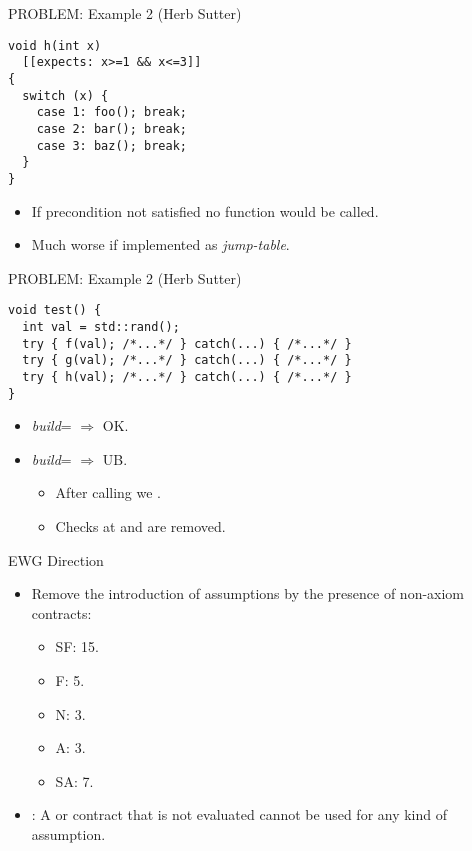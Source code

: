 \begin{frame}[t,fragile]{PROBLEM: Example 2 (Herb Sutter)}
\begin{block}{}
\begin{lstlisting}
void h(int x)
  [[expects: x>=1 && x<=3]]
{
  switch (x) {
    case 1: foo(); break;
    case 2: bar(); break;
    case 3: baz(); break;
  }
}
\end{lstlisting}
\end{block}
\begin{itemize}
	\item If precondition not satisfied \alert{no function would be called}.
	\item Much \alert{worse} if  implemented as \emph{jump-table}.
\end{itemize}
\end{frame}

\begin{frame}[t,fragile]{PROBLEM: Example 2 (Herb Sutter)}
\begin{block}{}
\begin{lstlisting}
void test() {
  int val = std::rand();
  try { f(val); /*...*/ } catch(...) { /*...*/ }
  try { g(val); /*...*/ } catch(...) { /*...*/ }
  try { h(val); /*...*/ } catch(...) { /*...*/ }
}
\end{lstlisting}
\end{block}
\begin{itemize}
\item \pause \emph{build}= $\Rightarrow$ OK.
\item \pause \emph{build}= $\Rightarrow$ \alert{UB}.
  \begin{itemize}
	  \item After calling  we  .
	  \item Checks at  and  are \alert{removed}.
  \end{itemize}

\end{itemize}
\end{frame}

\begin{frame}[t]{EWG Direction}
\begin{itemize}
\item Remove the introduction of assumptions by the presence of non-axiom contracts:
\begin{itemize}  
  \item SF: 15.
  \item F: 5.
  \item N: 3.
  \item A: 3.
  \item SA: 7.
\end{itemize}

\item {}: A  or  contract that is not evaluated 
      cannot be used for any kind of assumption.
\end{itemize}
\end{frame}
